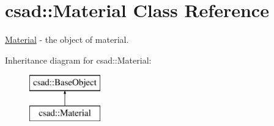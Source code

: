 \hypertarget{classcsad_1_1_material}{\section{csad\-:\-:Material Class Reference}
\label{classcsad_1_1_material}
}


\hyperlink{classcsad_1_1_material}{Material} -\/ the object of material.  


Inheritance diagram for csad\-:\-:Material\-:\begin{figure}[H]
\begin{center}
\leavevmode
\includegraphics[height=2.000000cm]{classcsad_1_1_material}
\end{center}
\end{figure}

